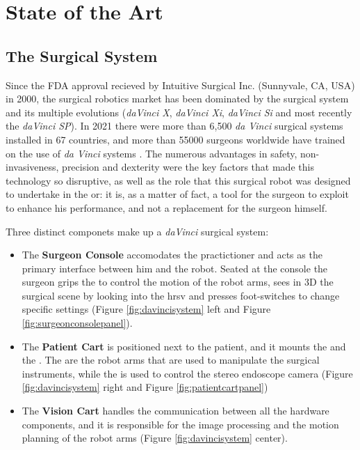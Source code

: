 \documentclass[../main.tex]{subfiles}
\begin{document}
\chapter{State of the Art}

\section{The \davinci Surgical System}
Since the FDA approval recieved by Intuitive Surgical Inc. (Sunnyvale, CA, USA) in 2000, the surgical robotics market has been dominated by the \davinci surgical system and its multiple evolutions (\textit{daVinci X}, \textit{daVinci Xi}, \textit{daVinci Si} and most recently the \textit{daVinci SP}). In 2021 there were more than 6,500 \textit{da Vinci} surgical systems installed in 67 countries, and more than 55000 surgeons worldwide have trained on the use of \textit{da Vinci} systems \cite{Intuitive2021}. The numerous advantages in safety, non-invasiveness, precision and dexterity were the key factors that made this technology so disruptive, as well as the role that this surgical robot was designed to undertake in the \ac{or}: it is, as a matter of fact, a tool for the surgeon to exploit to enhance his performance, and not a replacement for the surgeon himself.

Three distinct componets make up a \textit{daVinci} surgical system:
\begin{itemize}
   \item The \textbf{Surgeon Console} accomodates the practictioner and acts as the primary interface between him and the robot. Seated at the console the surgeon grips the \mtms to control the motion of the robot arms, sees in 3D the surgical scene by looking into the \ac{hrsv} and presses foot-switches to change specific settings (Figure \ref{fig:davincisystem} left and Figure \ref{fig:surgeonconsolepanel}).
    \item The \textbf{Patient Cart} is positioned next to the patient, and it mounts the \psms and the \ecm. The \psms are the robot arms that are used to manipulate the surgical instruments, while the \ecm is used to control the stereo endoscope camera (Figure \ref{fig:davincisystem} right and Figure \ref{fig:patientcartpanel})
    \item The \textbf{Vision Cart} handles the communication between all the hardware components, and it is responsible for the image processing and the motion planning of the robot arms (Figure \ref{fig:davincisystem} center).
\end{itemize}
\end{document}
